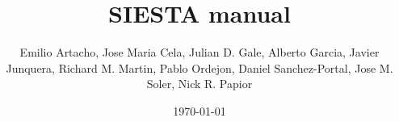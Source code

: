 


\providecommand\softwareversion{\unskip}

\title{SIESTA manual \softwareversion}

\date{\today}

\author{%
    Emilio Artacho, %
    Jose Maria Cela, %
    Julian D. Gale, %
    Alberto Garcia, %
    Javier Junquera, %
    Richard M. Martin, %
    Pablo Ordejon, %
    Daniel Sanchez-Portal, %
    Jose M. Soler, %
    Nick R. Papior%
}

\setpdfmetadata





